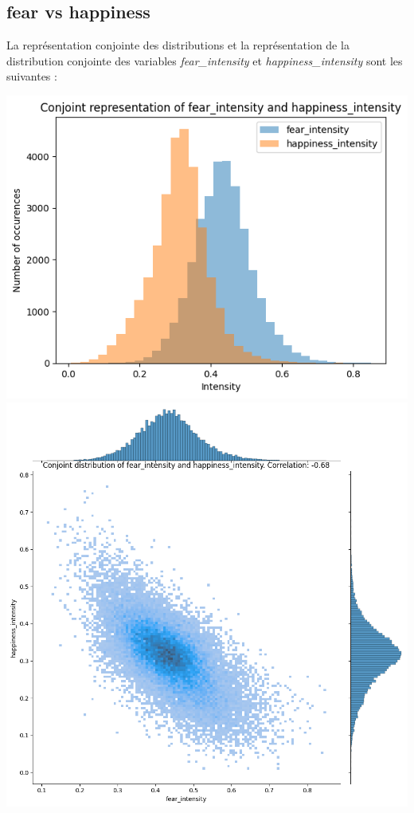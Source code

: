 \documentclass{article}
\begin{document}
\subsection*{fear vs happiness}

La représentation conjointe des distributions et la représentation de la
distribution conjointe des variables
\textit{fear\_intensity} et \textit{happiness\_intensity}
sont les suivantes :

\begin{center}
    \includegraphics[scale=0.39]{./img/conjoint_representation_fear_intensity_happiness_intensity.png}
    \includegraphics[scale=0.23]{./img/conjoint_distribution_fear_intensity_happiness_intensity.png}
\end{center}
\end{document}
